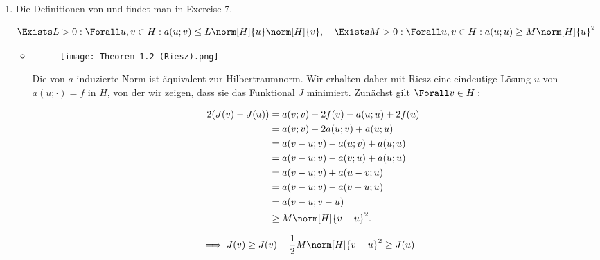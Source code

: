 \begin{solution}

\phantom{}

\begin{enumerate}[label = \textbf{\alph*)}]

  \item Die Definitionen von  und  findet man in Exercise 7.

  \begin{align*}
    \Exists L > 0:
    \Forall u, v \in H:
    a(u; v) \leq L \norm[H]{u} \norm[H]{v},
    \quad
    \Exists M > 0:
    \Forall u, v \in H:
    a(u; u) \geq M \norm[H]{u}^2
  \end{align*}

  \begin{itemize}

    \item
    [\Quote{$\implies$:}]

    \begin{figure}[h!]
      \centering
      \texttt{[image: Theorem 1.2 (Riesz).png]}
    \end{figure}

    Die von $a$ induzierte Norm ist äquivalent zur Hilbertraumnorm.
    Wir erhalten daher mit Riesz eine eindeutige Lösung $u$ von $a(u; \cdot) = f$ in $H$, von der wir zeigen, dass sie das Funktional $J$ minimiert.
    Zunächst gilt $\Forall v \in H:$

    \begin{align*}
      2 (J(v) - J(u))
      & =
      a(v; v) - 2f(v) - a(u; u) + 2 f(u) \\
      & =
      a(v; v) -2a(u; v) + a(u; u) \\
      & =
      a(v-u; v) - a(u; v) + a(u; u) \\
      & =
      a(v-u; v) - a(v; u) + a(u; u) \\
      & =
      a(v-u; v) + a(u-v; u) \\
      & =
      a(v-u; v) - a(v-u; u) \\
      & =
      a(v-u; v-u) \\
      & \geq
      M \norm[H]{v-u}^2.
    \end{align*}

    \begin{align*}
      \implies
      J(v)
      \geq
      J(v) - \frac{1}{2} M \norm[H]{v-u}^2
      & \geq
      J(u)
    \end{align*}


\end{itemize}
\end{enumerate}
\end{solution}
